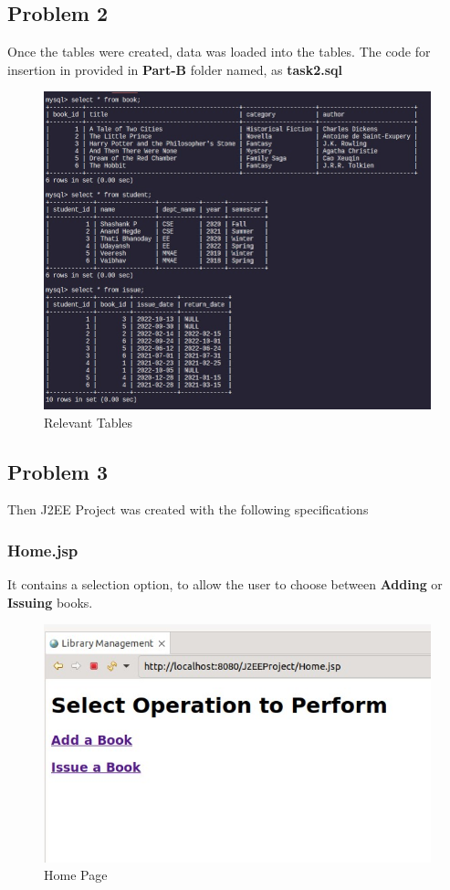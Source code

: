 \documentclass{article}
\begin{document}
\subsection{Problem 2}
Once the tables were created, data was loaded into the tables.
The code for insertion in provided in \textbf{Part-B} folder named, as
\textbf{task2.sql}
\begin{figure}[!ht]
  \begin{center}
    \includegraphics[scale=0.8]{2.jpg}
  \caption{Relevant Tables}
  \end{center}
\end{figure}

\newpage
\subsection{Problem 3}
Then J2EE Project was created with the following specifications
\subsubsection{Home.jsp}
It contains a selection option, to allow the user to choose between \textbf{Adding} or \textbf{Issuing} books.
\begin{figure}[!ht]
  \begin{center}
    \includegraphics[scale=0.8]{3_home.jpg}
  \caption{Home Page}
  \end{center}
\end{figure}
\end{document}
